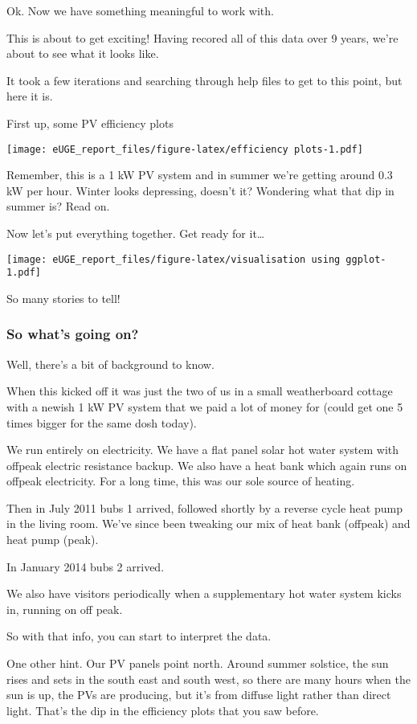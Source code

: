 \documentclass[]{article}
\begin{document}
Ok. Now we have something meaningful to work with.

This is about to get exciting! Having recored all of this data over 9
years, we're about to see what it looks like.

It took a few iterations and searching through help files to get to this
point, but here it is.

First up, some PV efficiency plots

\texttt{[image: eUGE\_report\_files/figure-latex/efficiency plots-1.pdf]}

Remember, this is a 1 kW PV system and in summer we're getting around
0.3 kW per hour. Winter looks depressing, doesn't it? Wondering what
that dip in summer is? Read on.

Now let's put everything together. Get ready for it\ldots{}

\texttt{[image: eUGE\_report\_files/figure-latex/visualisation using ggplot-1.pdf]}

So many stories to tell!

\subsubsection{So what's going on?}\label{so-whats-going-on}

Well, there's a bit of background to know.

When this kicked off it was just the two of us in a small weatherboard
cottage with a newish 1 kW PV system that we paid a lot of money for
(could get one 5 times bigger for the same dosh today).

We run entirely on electricity. We have a flat panel solar hot water
system with offpeak electric resistance backup. We also have a heat bank
which again runs on offpeak electricity. For a long time, this was our
sole source of heating.

Then in July 2011 bubs 1 arrived, followed shortly by a reverse cycle
heat pump in the living room. We've since been tweaking our mix of heat
bank (offpeak) and heat pump (peak).

In January 2014 bubs 2 arrived.

We also have visitors periodically when a supplementary hot water system
kicks in, running on off peak.

So with that info, you can start to interpret the data.

One other hint. Our PV panels point north. Around summer solstice, the
sun rises and sets in the south east and south west, so there are many
hours when the sun is up, the PVs are producing, but it's from diffuse
light rather than direct light. That's the dip in the efficiency plots
that you saw before.
\end{document}
